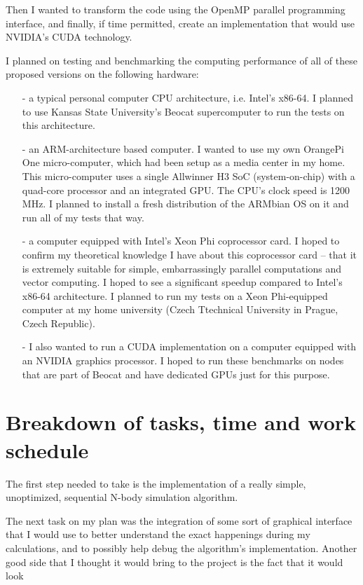 \documentclass[journal]{IEEEtran}
\begin{document}
		Then I wanted to transform the code using the OpenMP parallel programming interface, and finally, if time permitted, create an implementation that would use NVIDIA's CUDA technology.
		
		I planned on testing and benchmarking the computing performance of all of these proposed versions on the following hardware:
		\begin{itemize}  
			\item[-]{a typical personal computer CPU architecture, i.e. Intel’s x86-64. I planned to use Kansas State University’s Beocat supercomputer to run the tests on this architecture.}
			
			\item[-]{an ARM-architecture based computer. I wanted to use my own OrangePi One micro-computer, which had been  setup as a media center in my home. This micro-computer uses a single Allwinner H3 SoC (system-on-chip) with a quad-core processor and an integrated GPU. The CPU's clock speed is 1200 MHz. I planned to install a fresh distribution of the ARMbian OS on it and run all of my tests that way.}
			
			\item[-]{a computer equipped with Intel’s Xeon Phi coprocessor card. I hoped to confirm my theoretical knowledge I have about this coprocessor card – that it is extremely suitable for simple, embarrassingly parallel computations and vector computing. I hoped to see a significant speedup compared to Intel’s x86-64 architecture. I planned to run my tests on a Xeon Phi-equipped computer at my home university (Czech Ttechnical University in Prague, Czech Republic).}
			
			\item[-]{I also wanted to run a CUDA implementation on a computer equipped with an NVIDIA graphics processor. I hoped to run these benchmarks on nodes that are part of Beocat and have dedicated GPUs just for this purpose.}
		\end{itemize}
	
	\section{Breakdown of tasks, time and work schedule}
	
		The first step needed to take is the implementation of a really simple, unoptimized, sequential N-body simulation algorithm. 
		
		The next task on my plan was the integration of some sort of graphical interface that I would use to better understand the exact happenings during my calculations, and to possibly help debug the algorithm's implementation. Another good side that I thought it would bring to the project is the fact that it would look
		
\end{document}
